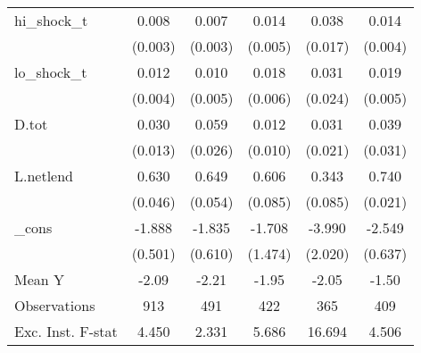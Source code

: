{\begin{tabular}{l*{5}{c}}
\addlinespace
hi\_shock\_t  &       0.008\sym{***}&       0.007\sym{**} &       0.014\sym{***}&       0.038\sym{**} &       0.014\sym{***}\\
            &     (0.003)         &     (0.003)         &     (0.005)         &     (0.017)         &     (0.004)         \\
\addlinespace
lo\_shock\_t  &       0.012\sym{***}&       0.010\sym{*}  &       0.018\sym{***}&       0.031         &       0.019\sym{***}\\
            &     (0.004)         &     (0.005)         &     (0.006)         &     (0.024)         &     (0.005)         \\
\addlinespace
D.tot       &       0.030\sym{**} &       0.059\sym{**} &       0.012         &       0.031         &       0.039         \\
            &     (0.013)         &     (0.026)         &     (0.010)         &     (0.021)         &     (0.031)         \\
\addlinespace
L.netlend   &       0.630\sym{***}&       0.649\sym{***}&       0.606\sym{***}&       0.343\sym{***}&       0.740\sym{***}\\
            &     (0.046)         &     (0.054)         &     (0.085)         &     (0.085)         &     (0.021)         \\
\addlinespace
\_cons      &      -1.888\sym{***}&      -1.835\sym{***}&      -1.708         &      -3.990\sym{*}  &      -2.549\sym{***}\\
            &     (0.501)         &     (0.610)         &     (1.474)         &     (2.020)         &     (0.637)         \\
\midrule
Mean Y      &       -2.09         &       -2.21         &       -1.95         &       -2.05         &       -1.50         \\
Observations&         913         &         491         &         422         &         365         &         409         \\
Exc. Inst. F-stat&       4.450         &       2.331         &       5.686         &      16.694         &       4.506         \\
\bottomrule
\end{tabular}
}
